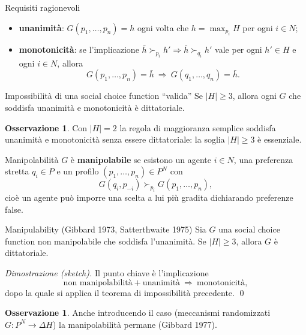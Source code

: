 \documentclass[12pt,a4paper,twoside]{book}
\theoremstyle{plain}
\theoremstyle{definition}
\newtheorem{remark}[theorem]{Osservazione}
\begin{document}
\begin{defbox}{Requisiti ragionevoli}
\begin{itemize}
  \item \textbf{unanimità}: $G(p_1,\dots,p_n)=h$ ogni volta che $h=\max_{p_i}H$ per ogni $i\in N$;
  \item \textbf{monotonicità}: se l'implicazione $\bar h\succ_{p_i}h'\Rightarrow \bar h\succ_{q_i}h'$ vale per ogni $h'\in H$ e ogni $i\in N$, allora
  \[ G(p_1,\dots,p_n)=\bar h\ \Longrightarrow\ G(q_1,\dots,q_n)=\bar h. \]
\end{itemize}
\end{defbox}

\begin{thmbox}{Impossibilità di una social choice function ``valida''}
Se $|H|\ge 3$, allora ogni $G$ che soddisfa unanimità e monotonicità è dittatoriale.
\end{thmbox}

\begin{remark}
Con $|H|=2$ la regola di maggioranza semplice soddisfa unanimità e monotonicità senza essere dittatoriale: la soglia $|H|\ge 3$ è essenziale.
\end{remark}

\begin{defbox}{Manipolabilità}
$G$ è \textbf{manipolabile} se esistono un agente $i\in N$, una preferenza stretta $q_i\in P$ e un profilo $(p_1,\dots,p_n)\in P^N$ con
\[ G(q_i,p_{-i})\succ_{p_i}G(p_1,\dots,p_n), \]
cioè un agente può imporre una scelta a lui più gradita dichiarando preferenze false.
\end{defbox}

\begin{thmbox}{Manipulability (Gibbard 1973, Satterthwaite 1975)}
Sia $G$ una social choice function non manipolabile che soddisfa l'unanimità. Se $|H|\ge 3$, allora $G$ è dittatoriale.
\end{thmbox}

\textit{Dimostrazione (sketch).} Il punto chiave è l'implicazione
\[ \text{non manipolabilità}+\text{unanimità}\ \Longrightarrow\ \text{monotonicità}, \]
dopo la quale si applica il teorema di impossibilità precedente. \qed

\begin{remark}
Anche introducendo il caso (meccanismi randomizzati $G:P^N\to\Delta H$) la manipolabilità permane (Gibbard 1977).
\end{remark}
\end{document}
